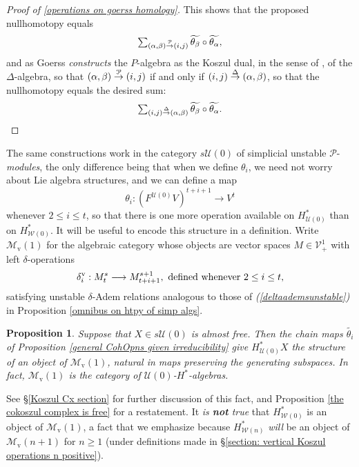 \documentclass[11pt]{amsart} \renewcommand{\baselinestretch}{1.4}
\theoremstyle{plain}
\newtheorem{prop}[thm]{Proposition}
\theoremstyle{definition}
\renewcommand{\to}{\longrightarrow}
\newcommand{\calU}{\mathcal{U}}
\newcommand{\calP}{\mathcal{P}}
\newcommand{\calV}{\mathcal{V}}
\newcommand{\calw}{\mathcal{W}}
\newcommand{\calMv}{\mathcal{M}\dver}
\newcommand{\Palg}{{\calP}}
\newcommand{\vect}[2]{\calV^{#1}_{#2}}
\newcommand{\produces}[3]{#3:#1\sim #2}
\renewcommand{\produces}[3]{#1\rightarrow_{#3} #2}%
\renewcommand{\produces}[3]{#1\overset{\smash{#3}}{\rightarrow} #2}%
\newcommand{\uver}{^\mathrm{v}}
\newcommand{\dver}{_\mathrm{v}}
\newcommand{\deltav}{\delta\uver}
\begin{document}
\begin{Cohomology Operations for W and U}
\begin{proof}[Proof of \ref{operations on goerss homology}]
This shows that the proposed nullhomotopy equals  
\[\textstyle\sum_{\produces{(\alpha,\beta)}{(i,j)}{\Palg}}\widetilde{\theta_\beta}\circ\widetilde{\theta_\alpha},\]
 and as Goerss \cite{MR1089001} \emph{constructs} the $P$-algebra as the Koszul dual, in the sense of \cite{PriddyKoszul.pdf}, of the $\Delta$-algebra, so that $\produces{(\alpha,\beta)}{(i,j)}{\Palg}$ if and only if $\produces{(i,j)}{(\alpha,\beta)}{\Delta}$, so that the nullhomotopy equals the desired sum:
\[\textstyle\sum_{\produces{(i,j)}{(\alpha,\beta)}{\Delta}}\widetilde{\theta_\beta}\circ\widetilde{\theta_\alpha}.\qedhere\]
\end{proof}
The same constructions work in the category $s\calU(0)$ of simplicial unstable $\Palg$-\emph{modules}, the only difference being that when we define $\theta_i$, we need not worry about Lie algebra structures, and we can define a map
\[\theta_i:(F^{\calU(0)}V)^{t+i+1}\to V^t\]
whenever $2\leq i\leq t$, so that there is one more operation available on $H^*_{\calU(0)}$ than on $H^*_{\calw(0)}$. It will be useful to encode this structure in a definition. Write $\calMv(1)$ for the algebraic category whose objects are vector spaces $M\in\vect{1}{+}$ with left $\delta$-operations
\[\deltav_i:M^{s}_t\to M^{s+1}_{t+i+1},\textup{ defined whenever $2\leq i\leq t$,}\]
satisfying unstable $\delta$-Adem relations analogous to those of \emph{(\ref{deltaademsunstable})} in Proposition \ref{omnibus on htpy of simp algs}.
\begin{prop}
\label{operations on untable P homology}
Suppose that $X\in s\calU(0)$ is almost free. Then the chain maps $\widetilde{\theta_i}$ of Proposition \ref{general CohOpns given irreducibility} give $H^*_{\calU(0)}X$ the structure of an object of $\calMv(1)$, natural in maps preserving the generating subspaces. In fact, $\calMv(1)$ is the category of $\calU(0)$-$H^*$-algebras.
\end{prop}
\noindent See \S\ref{Koszul Cx section} for further discussion of this fact, and Proposition \ref{the cokoszul complex is free} for a restatement. It \emph{is \textbf{not} true} that $H^*_{\calw(0)}$ is an object of $\calMv(1)$, a fact that we emphasize because $H^*_{\calw(n)}$ \emph{will} be an object of $\calMv(n+1)$ for $n\geq 1$ (under definitions made in \S\ref{section: vertical Koszul operations n positive}).


\end{Cohomology Operations for W and U}
\end{document}
